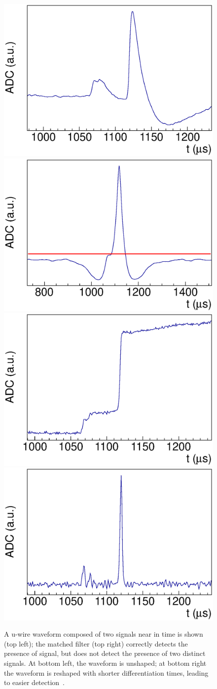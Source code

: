 \begin{figure}
\begin{center}
\includegraphics[keepaspectratio=true,width=.49\textwidth]{MSF_Raw.eps}
\includegraphics[keepaspectratio=true,width=.49\textwidth]{MSF_MatchedFilter.eps}
\includegraphics[keepaspectratio=true,width=.49\textwidth]{MSF_Unshaped.eps}
\includegraphics[keepaspectratio=true,width=.49\textwidth]{MSF_Reshaped.eps}
\end{center}
\renewcommand{\baselinestretch}{1}
\small\normalsize
\begin{quote}
\caption{A u-wire waveform composed of two signals near in time is shown (top left); the matched filter (top right) correctly detects the presence of signal, but does not detect the presence of two distinct signals.  At bottom left, the waveform is unshaped; at bottom right the waveform is reshaped with shorter differentiation times, leading to easier detection~\cite{ReconstructionDocument}.}
\label{fig:MultipleSignalFinderApplication}
\end{quote}
\end{figure}
\renewcommand{\baselinestretch}{2}
\small\normalsize

